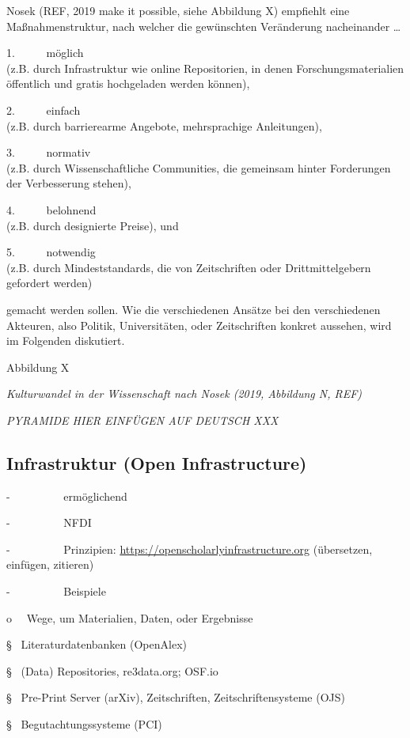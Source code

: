\documentclass[
  letterpaper,
  DIV=11,
  numbers=noendperiod]{scrreprt}
\begin{document}
Nosek (REF, 2019 make it possible, siehe Abbildung X) empfiehlt eine
Maßnahmenstruktur, nach welcher die gewünschten Veränderung nacheinander
\ldots{}

1.~~~~~ möglich\\
(z.B. durch Infrastruktur wie online Repositorien, in denen
Forschungsmaterialien öffentlich und gratis hochgeladen werden können),

2.~~~~~ einfach\\
(z.B. durch barrierearme Angebote, mehrsprachige Anleitungen),

3.~~~~~ normativ\\
(z.B. durch Wissenschaftliche Communities, die gemeinsam hinter
Forderungen der Verbesserung stehen),

4.~~~~~ belohnend\\
(z.B. durch designierte Preise), und

5.~~~~~ notwendig\\
(z.B. durch Mindeststandards, die von Zeitschriften oder
Drittmittelgebern gefordert werden)

gemacht werden sollen. Wie die verschiedenen Ansätze bei den
verschiedenen Akteuren, also Politik, Universitäten, oder Zeitschriften
konkret aussehen, wird im Folgenden diskutiert.

Abbildung X

\emph{Kulturwandel in der Wissenschaft nach Nosek (2019, Abbildung N,
REF)}

\emph{PYRAMIDE HIER EINFÜGEN AUF DEUTSCH XXX}

\subsection{Infrastruktur (Open
Infrastructure)}\label{infrastruktur-open-infrastructure}

-~~~~~~~~~ ermöglichend

-~~~~~~~~~ NFDI

-~~~~~~~~~ Prinzipien: \url{https://openscholarlyinfrastructure.org}
(übersetzen, einfügen, zitieren)

-~~~~~~~~~ Beispiele

o~~ Wege, um Materialien, Daten, oder Ergebnisse

§~ Literaturdatenbanken (OpenAlex)

§~ (Data) Repositories, re3data.org; OSF.io

§~ Pre-Print Server (arXiv), Zeitschriften, Zeitschriftensysteme (OJS)

§~ Begutachtungssysteme (PCI)
\end{document}
